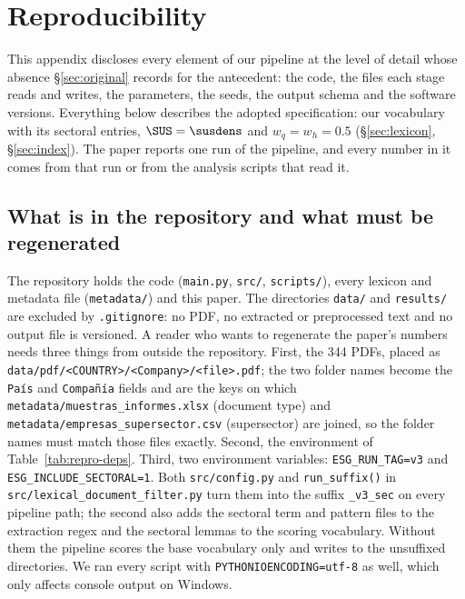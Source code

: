 \section{Reproducibility}
\label{sec:repro}
\begingroup
\setlength{\emergencystretch}{3em}

This appendix discloses every element of our pipeline at the level of detail
whose absence \S\ref{sec:original} records for the antecedent: the code, the
files each stage reads and writes, the parameters, the seeds, the output
schema and the software versions. Everything below describes the adopted
specification: our vocabulary with its sectoral entries,
$\SUS = \susdens$ and $w_q = w_h = 0.5$ (\S\ref{sec:lexicon},
\S\ref{sec:index}). The paper reports one run of the pipeline, and every
number in it comes from that run or from the analysis scripts that read it.

\subsection{What is in the repository and what must be regenerated}
\label{sec:repro-regenerate}

The repository holds the code (\nolinkurl{main.py}, \nolinkurl{src/},
\nolinkurl{scripts/}), every lexicon and metadata file (\nolinkurl{metadata/})
and this paper. The directories \nolinkurl{data/} and \nolinkurl{results/} are
excluded by \nolinkurl{.gitignore}: no PDF, no extracted or preprocessed text
and no output file is versioned. A reader who wants to regenerate the paper's
numbers needs three things from outside the repository. First, the 344 PDFs,
placed as \nolinkurl{data/pdf/<COUNTRY>/<Company>/<file>.pdf}; the two folder
names become the \texttt{País} and \texttt{Compañía} fields and are the keys
on which \nolinkurl{metadata/muestras_informes.xlsx} (document type) and
\nolinkurl{metadata/empresas_supersector.csv} (supersector) are joined, so the
folder names must match those files exactly. Second, the environment of
Table~\ref{tab:repro-deps}. Third, two environment variables:
\texttt{ESG\_RUN\_TAG=v3} and \texttt{ESG\_INCLUDE\_SECTORAL=1}. Both
\nolinkurl{src/config.py} and \texttt{run\_suffix()} in
\nolinkurl{src/lexical_document_filter.py} turn them into the suffix
\texttt{\_v3\_sec} on every pipeline path; the second also adds the sectoral
term and pattern files to the extraction regex and the sectoral lemmas to the
scoring vocabulary. Without them the pipeline scores the base vocabulary only
and writes to the unsuffixed directories. We ran every script with
\texttt{PYTHONIOENCODING=utf-8} as well, which only affects console output on
Windows.

